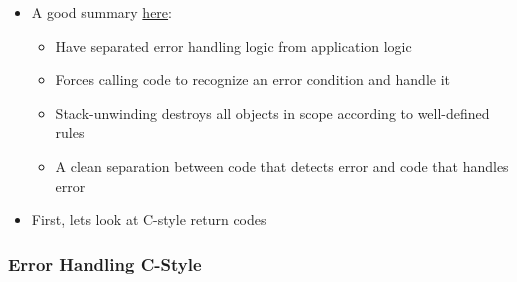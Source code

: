 \begin{itemize}
\itemsep1pt\parskip0pt
\item
  A good summary
  \href{https://msdn.microsoft.com/en-us/library/hh279678.aspx}{here}:

  \begin{itemize}
  \itemsep1pt\parskip0pt
  \item
    Have separated error handling logic from application logic
  \item
    Forces calling code to recognize an error condition and handle it
  \item
    Stack-unwinding destroys all objects in scope according to
    well-defined rules
  \item
    A clean separation between code that detects error and code that
    handles error
  \end{itemize}
\item
  First, lets look at C-style return codes
\end{itemize}

\subsubsection{Error Handling C-Style}\label{error-handling-c-style}

\begin{Shaded}
\begin{Highlighting}[]
   
\NormalTok{\{}
  
  \NormalTok{\{}
     \NormalTok{;}
  \NormalTok{\} }  
     \NormalTok{;}
  \NormalTok{\} } \NormalTok{\{}
     \NormalTok{;}
  \NormalTok{\}}
\NormalTok{\}}

   
\NormalTok{\{}
  
  \NormalTok{) }
   \NormalTok{) }
 \NormalTok{\{}
 \NormalTok{\}}
\NormalTok{\} }
\end{Highlighting}
\end{Shaded}


